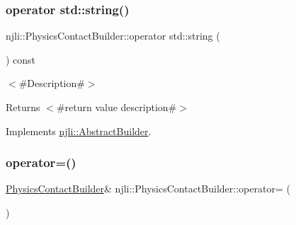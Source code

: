 \subsubsection{\texorpdfstring{operator std\+::string()}{operator std::string()}}
{\footnotesize\ttfamily njli\+::\+Physics\+Contact\+Builder\+::operator std\+::string (\begin{DoxyParamCaption}{ }\end{DoxyParamCaption}) const\hspace{0.3cm}{\ttfamily [virtual]}}

$<$\#\+Description\#$>$

\begin{DoxyReturn}{Returns}
$<$\#return value description\#$>$ 
\end{DoxyReturn}


Implements \mbox{\hyperlink{classnjli_1_1_abstract_builder_a3e6e553e06d1ca30517ad5fb0bd4d000}{njli\+::\+Abstract\+Builder}}.

\mbox{\label{classnjli_1_1_physics_contact_builder_af1319899b50158cd3669cb538a324049}} 
\subsubsection{\texorpdfstring{operator=()}{operator=()}}
{\footnotesize\ttfamily \mbox{\hyperlink{classnjli_1_1_physics_contact_builder}{Physics\+Contact\+Builder}}\& njli\+::\+Physics\+Contact\+Builder\+::operator= (\begin{DoxyParamCaption}\item[{const \mbox{\hyperlink{classnjli_1_1_physics_contact_builder}{Physics\+Contact\+Builder}} \&}]{ }\end{DoxyParamCaption})\hspace{0.3cm}{\ttfamily [protected]}}

\mbox{\label{classnjli_1_1_physics_contact_builder_af0f3dd42490776358dd492c47e85ab89}} 
